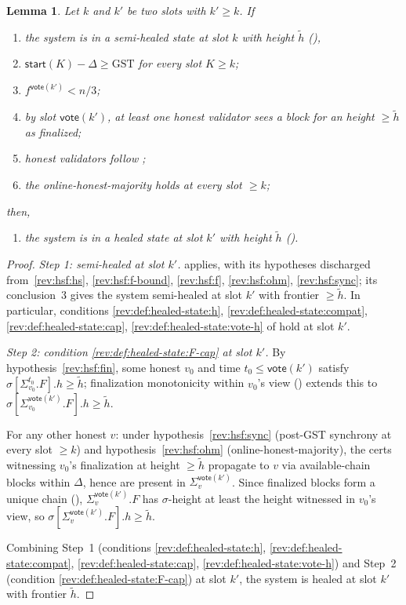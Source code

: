 \ifx\litemode\undefined\documentclass{article}\fi
\newcommand{\start}{\ensuremath{\mathsf{start}}}
\newcommand{\vote}{\ensuremath{\mathsf{vote}}}
\newcommand{\GST}{\ensuremath{\mathrm{GST}}\xspace}
\newcommand{\comm}[1]{\ensuremath{\widetilde{#1}}}
\theoremstyle{plain}
\newtheorem{lemma}{Lemma}
\theoremstyle{definition}
\theoremstyle{remark}
\begin{document}
\begin{lemma}\label{rev:lem:healed-from-fin}
Let $k$ and $k'$ be two slots with $k' \geq k$.
If
\begin{enumerate}
  \item\label{rev:hsf:hs} the system is in a semi-healed state at slot $k$ with height $\comm{h}$ (),
  \item\label{rev:hsf:sync} $\start(K) - \Delta \geq \GST$ for every slot $K \geq k$;
  \item\label{rev:hsf:f-bound} $f^{\vote(k')}<n/3$;
  \item\label{rev:hsf:fin} by slot $\vote(k')$, at least one honest validator sees a block for an height $\geq \comm{h}$ as finalized;
  \item\label{rev:hsf:f} honest validators follow ;
  \item\label{rev:hsf:ohm} the online-honest-majority holds at every slot $\geq k$;
\end{enumerate}
then,
\begin{enumerate}
  \item the system is in a healed state at slot $k'$ with height $\comm{h}$ ().
\end{enumerate}
\end{lemma}

\begin{proof}
\emph{Step 1: semi-healed at slot $k'$.}
 applies, with its hypotheses discharged from~\ref{rev:hsf:hs}, \ref{rev:hsf:f-bound}, \ref{rev:hsf:f}, \ref{rev:hsf:ohm}, \ref{rev:hsf:sync};
its conclusion~3 gives the system semi-healed at slot $k'$ with frontier $\geq \comm{h}$.
In particular, conditions \ref{rev:def:healed-state:h}, \ref{rev:def:healed-state:compat}, \ref{rev:def:healed-state:cap}, \ref{rev:def:healed-state:vote-h} of  hold at slot $k'$.

\emph{Step 2: condition \ref{rev:def:healed-state:F-cap} at slot $k'$.}
By hypothesis~\ref{rev:hsf:fin}, some honest $v_0$ and time $t_0 \leq \vote(k')$ satisfy $\sigma[\Sigma_{v_0}^{t_0}.F].h \geq \comm{h}$;
finalization monotonicity within $v_0$'s view () extends this to $\sigma[\Sigma_{v_0}^{\vote(k')}.F].h \geq \comm{h}$.

For any other honest $v$: under hypothesis~\ref{rev:hsf:sync} (post-GST synchrony at every slot $\geq k$) and hypothesis~\ref{rev:hsf:ohm} (online-honest-majority), the certs witnessing $v_0$'s finalization at height $\geq \comm{h}$ propagate to $v$ via available-chain blocks within $\Delta$, hence are present in $\Sigma_v^{\vote(k')}$.
Since finalized blocks form a unique chain (), $\Sigma_v^{\vote(k')}.F$ has $\sigma$-height at least the height witnessed in $v_0$'s view, so $\sigma[\Sigma_v^{\vote(k')}.F].h \geq \comm{h}$.

Combining Step~1 (conditions \ref{rev:def:healed-state:h}, \ref{rev:def:healed-state:compat}, \ref{rev:def:healed-state:cap}, \ref{rev:def:healed-state:vote-h}) and Step~2 (condition \ref{rev:def:healed-state:F-cap}) at slot $k'$, the system is healed at slot $k'$ with frontier $\comm{h}$.
\end{proof}
\end{document}
